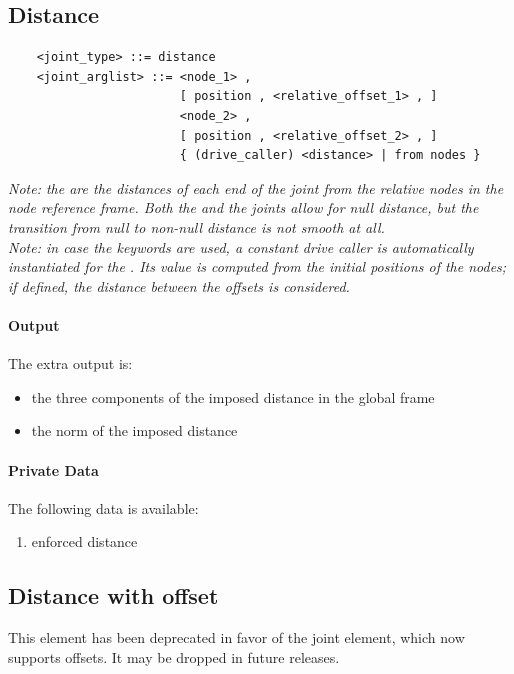\subsection{Distance}
\begin{verbatim}
    <joint_type> ::= distance 
    <joint_arglist> ::= <node_1> , 
                        [ position , <relative_offset_1> , ]
                        <node_2> ,
                        [ position , <relative_offset_2> , ]
                        { (drive_caller) <distance> | from nodes }
\end{verbatim}

\noindent
{\em 
    Note: the  are the distances of each end
    of the joint from the relative nodes in the node reference frame.
    Both the  and the  joints
    allow for null distance, but the transition from null to non-null
    distance is not smooth at all.
} \\
{\em
    Note: in case the keywords  are used, a constant drive
    caller is automatically instantiated for the . 
    Its value is computed from the initial positions of the nodes;
    if defined, the distance between the offsets is considered. 
}

\paragraph{Output}
The extra output is:
\begin{itemize}
    \item the three components of the imposed distance in the global frame
    \item the norm of the imposed distance
\end{itemize}

\paragraph{Private Data}
The following data is available:
\begin{enumerate}
\item {} enforced distance
\end{enumerate}



\subsection{Distance with offset}
This element has been deprecated in favor of the 
joint element, which now supports offsets.
It may be dropped in future releases.

